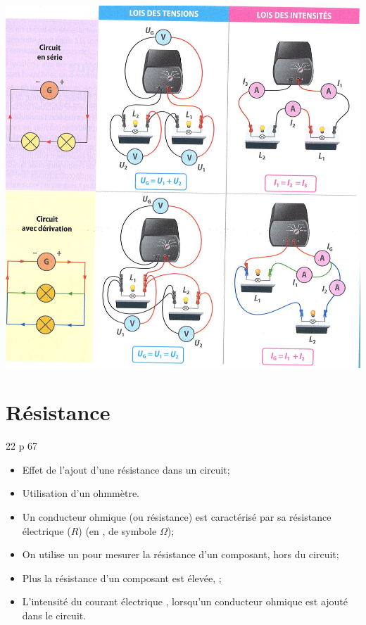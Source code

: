 \documentclass[12pt,a4paper]{article}
\begin{document}
\begin{center}
	\includegraphics[scale=0.8]{img/lois_elec}
\end{center}

\section{Résistance}

	
	\begin{myact}{22 p 67}
		\begin{itemize}
			\item Effet de l'ajout d'une résistance dans un circuit;
			\item Utilisation d'un ohmmètre.
		\end{itemize}
		
	\end{myact}	
		
		

	\begin{mybilan}
		\begin{itemize}
			\item Un conducteur ohmique (ou résistance) est caractérisé par sa résistance électrique ($R$) (en , de symbole $\Omega$);
			\item On utilise un   pour mesurer la résistance d'un composant, hors du circuit;
			\item Plus la résistance d'un composant est élevée, ;
			\item L'intensité du courant électrique , lorsqu'un conducteur ohmique est ajouté dans le circuit.
		\end{itemize}
	\end{mybilan}
\end{document}
